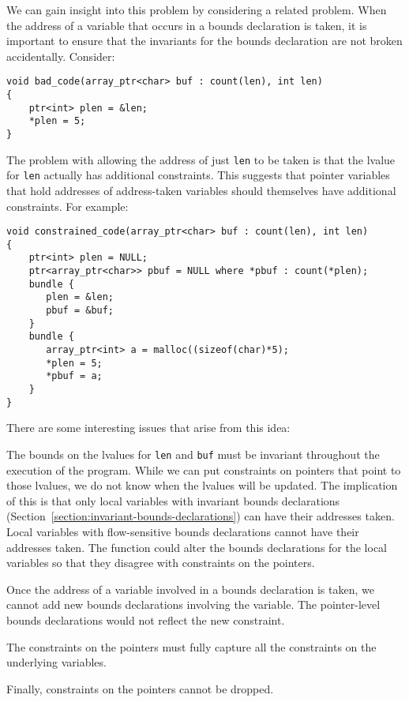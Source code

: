 We can gain insight into this problem by considering a related
problem.   When the address of a variable that occurs in a bounds declaration is 
taken, it is important to ensure that the invariants for the bounds declaration are not
broken accidentally.  Consider:
\begin{verbatim}
void bad_code(array_ptr<char> buf : count(len), int len) 
{
    ptr<int> plen = &len;
    *plen = 5;
}
\end{verbatim}
The problem with allowing the address of just \texttt{len} to be taken is
that the lvalue for \texttt{len} actually has additional constraints. This
suggests that pointer variables that hold addresses of address-taken variables should
themselves have additional constraints.  For example:
\begin{verbatim}
void constrained_code(array_ptr<char> buf : count(len), int len) 
{
    ptr<int> plen = NULL;
    ptr<array_ptr<char>> pbuf = NULL where *pbuf : count(*plen);
    bundle {
       plen = &len;
       pbuf = &buf;
    }
    bundle {
       array_ptr<int> a = malloc((sizeof(char)*5);
       *plen = 5;
       *pbuf = a;
    }
}
\end{verbatim}
There are some interesting issues that arise from this idea:
\begin{compactitem}
\item The bounds on the lvalues for \texttt{len} and
\texttt{buf} must be invariant throughout the execution of the program.
While we can put constraints on pointers that point to those lvalues,
we do not know when the lvalues will be updated.
The implication of this is that only local variables with invariant
bounds declarations (Section~\ref{section:invariant-bounds-declarations})
can have their addresses taken.   Local variables
with flow-sensitive bounds declarations cannot have their addresses taken.
The function could alter the bounds declarations for the local variables
so that they disagree with constraints on the pointers.
\item Once the address of a variable involved in a bounds declaration 
is taken, we cannot add new bounds declarations involving the variable.
The pointer-level bounds declarations would not reflect the new constraint.
\item The constraints on the pointers must fully capture 
all the constraints on the underlying variables.
\item Finally, constraints on the pointers cannot be dropped.
\end{compactitem}

